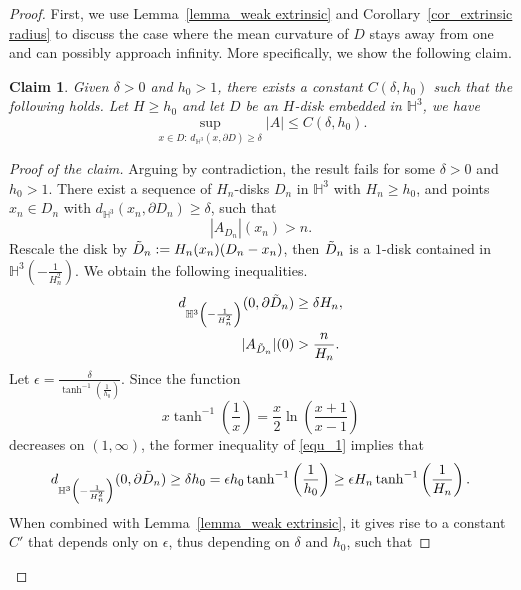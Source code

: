 \documentclass[12pt,a4paper]{amsart}
\numberwithin{equation}{section}
\theoremstyle{plain}
\newtheorem{Claim}[Th]{Claim}
\theoremstyle{named}
\theoremstyle{definition}
\begin{document}
\begin{proof}
First, we use Lemma~\ref{lemma_weak extrinsic} and Corollary~\ref{cor_extrinsic radius} to discuss the case where the mean curvature of $D$ stays away from one and can possibly approach infinity. More specifically, we show the following claim.
\begin{Claim}
    Given $\delta>0$ and $h_0>1$, there exists a constant $C(\delta,h_0)$ such that the following holds. Let $H\geq h_0$ and let $D$ be an $H$-disk embedded in $\mathbb{H}^3$, we have \begin{equation*}
       \sup_{x\in D: \,d_{\mathbb{H}^3}(x,\partial D)\geq \delta}|A|\leq C(\delta,h_0).
   \end{equation*}
\end{Claim}

\begin{proof}[Proof of the claim]
     Arguing by contradiction, the result fails for some $\delta>0$ and $h_0>1$. There exist a sequence of $H_n$-disks $D_n$ in $\mathbb{H}^3$ with $H_n\geq h_0$, and points $x_n\in D_n$ with $d_{\mathbb{H}^3}(x_n,\partial D_n)\geq \delta$, such that \begin{equation}\label{equ_assump_ext_2}
        |A_{D_n}|(x_n)>n.
    \end{equation}
    Rescale the disk by $\Tilde{D}_n:=H_n(x_n)(D_n-x_n)$, then $\Tilde{D}_n$ is a $1$-disk contained in $\mathbb{H}^3\left(-\frac{1}{H_n^2}\right)$. We obtain the following inequalities. \begin{align}\label{equ_1}
         d_{\mathbb{H}^3\left(-\frac{1}{H_n^2}\right)}(0,\partial\Tilde{D}_n) &\geq \delta H_n,\\\nonumber
         |A_{\Tilde{D}_n}|(0)&>\frac{n}{H_n}.
    \end{align}
Let $\epsilon=\frac{\delta}{\tanh^{-1}\left(\frac{1}{h_0}\right)}$. Since the function \begin{equation*}
    x\tanh^{-1}\left(\frac{1}{x}\right)=\frac{x}{2}\ln\left(\frac{x+1}{x-1}\right)
\end{equation*}
decreases on $(1,\infty)$,
the former inequality of \eqref{equ_1} implies that \begin{equation*}
    d_{\mathbb{H}^3\left(-\frac{1}{H_n^2}\right)}(0,\partial\Tilde{D}_n)\geq \delta h_0=\epsilon h_0\tanh^{-1}\left(\frac{1}{h_0}\right)\geq \epsilon H_n\tanh^{-1}\left(\frac{1}{H_n}\right).
\end{equation*}
When combined with Lemma~\ref{lemma_weak extrinsic}, it gives rise to a constant $C'$ that depends only on $\epsilon$, thus depending on $\delta$ and $h_0$, such that 

\end{proof}
\end{proof}
\end{document}
